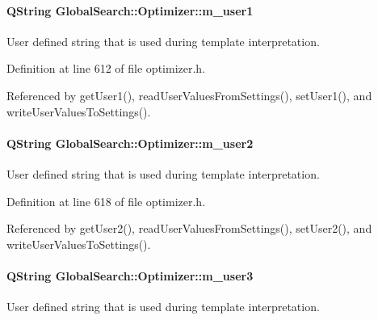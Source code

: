 \hypertarget{classGlobalSearch_1_1Optimizer_ae300aaecb74a7a61a501e4b8bd988957}{}
\paragraph[{m\+\_\+user1}]{\setlength{\rightskip}{0pt plus 5cm}Q\+String Global\+Search\+::\+Optimizer\+::m\+\_\+user1\hspace{0.3cm}{\ttfamily [protected]}}\label{classGlobalSearch_1_1Optimizer_ae300aaecb74a7a61a501e4b8bd988957}
User defined string that is used during template interpretation. 

Definition at line 612 of file optimizer.\+h.



Referenced by get\+User1(), read\+User\+Values\+From\+Settings(), set\+User1(), and write\+User\+Values\+To\+Settings().

\hypertarget{classGlobalSearch_1_1Optimizer_a5ca1294d2a3aa119dfab655dfa270d3a}{}
\paragraph[{m\+\_\+user2}]{\setlength{\rightskip}{0pt plus 5cm}Q\+String Global\+Search\+::\+Optimizer\+::m\+\_\+user2\hspace{0.3cm}{\ttfamily [protected]}}\label{classGlobalSearch_1_1Optimizer_a5ca1294d2a3aa119dfab655dfa270d3a}
User defined string that is used during template interpretation. 

Definition at line 618 of file optimizer.\+h.



Referenced by get\+User2(), read\+User\+Values\+From\+Settings(), set\+User2(), and write\+User\+Values\+To\+Settings().

\hypertarget{classGlobalSearch_1_1Optimizer_a279ca8ed61d6ca36f70c5c69b4d57397}{}
\paragraph[{m\+\_\+user3}]{\setlength{\rightskip}{0pt plus 5cm}Q\+String Global\+Search\+::\+Optimizer\+::m\+\_\+user3\hspace{0.3cm}{\ttfamily [protected]}}\label{classGlobalSearch_1_1Optimizer_a279ca8ed61d6ca36f70c5c69b4d57397}
User defined string that is used during template interpretation. 

